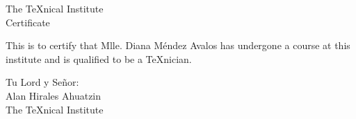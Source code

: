 \documentclass{article}
\begin{document}
\begin{center}
  The \TeX nical Institute\\[.75cm]
    Certificate
\end{center}

\noindent This is to certify that Mlle. Diana M\'{e}ndez Avalos has undergone a
course at this institute and is qualified to be a \TeX nician.

\begin{flushright}
Tu Lord y Se\~nor:\\
Alan Hirales Ahuatzin\\[5 pt ]
The \TeX nical Institute
\end{flushright}
\end{document}
